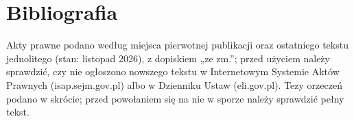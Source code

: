 \makeatletter
\providecommand{\BibItem}[2]{\item[\textbf{[#1]}]\def\@currentlabel{#1}\def\@currentlabelname{#1}\phantomsection\label{bib:#2}}
\makeatother
\providecommand{\Zr}[1]{[\ref{bib:#1}]}
\newenvironment{BibList}{\begin{list}{}{\setlength{\labelwidth}{2.6cm}\setlength{\leftmargin}{2.9cm}\setlength{\labelsep}{0.3cm}\setlength{\itemsep}{0.15em}\setlength{\parsep}{0pt}\small}}{\end{list}}

\chapter*{Bibliografia}

Akty prawne podano według miejsca pierwotnej publikacji oraz ostatniego tekstu jednolitego (stan: listopad 2026), z dopiskiem „ze zm.”; przed użyciem należy sprawdzić, czy nie ogłoszono nowszego tekstu w Internetowym Systemie Aktów Prawnych (isap.sejm.gov.pl) albo w Dzienniku Ustaw (eli.gov.pl). Tezy orzeczeń podano w skrócie; przed powołaniem się na nie w sporze należy sprawdzić pełny tekst.

